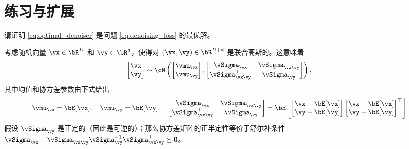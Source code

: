 \documentclass[../../book-main_zh.tex]{subfiles}
\begin{document}




\section{练习与扩展}

\begin{exercise}
    请证明 \eqref{eq:optimal_denoiser} 是问题 \eqref{eq:denoising_loss} 的最优解。
\end{exercise}

\begin{exercise}\label{exercise:conditional_gaussian}
  考虑随机向量 $\vx \in \bR^D$ 和 $\vy \in \bR^d$，使得对 $(\vx, \vy) \in \bR^{D + d}$ 是联合高斯的。这意味着
  \begin{equation*}
    \begin{bmatrix}
      \vx \\
      \vy
    \end{bmatrix}
    \sim
    \cN \left(
      \begin{bmatrix}
        \vmu_{\vx} \\
        \vmu_{\vy}
      \end{bmatrix}
      ,
      \begin{bmatrix}
        \vSigma_{\vx} & \vSigma_{\vx\vy} \\
        \vSigma_{\vx\vy}^\top & \vSigma_{\vy}
      \end{bmatrix}
    \right),
  \end{equation*}
  其中均值和协方差参数由下式给出
  \begin{equation*}
    \vmu_{\vx} = \bE[\vx],\quad \vmu_{\vy} = \bE[\vy],\quad
    \begin{bmatrix}
      \vSigma_{\vx} & \vSigma_{\vx\vy} \\
      \vSigma_{\vx\vy}^\top & \vSigma_{\vy}
    \end{bmatrix}
    =
    \bE\left[
      \begin{bmatrix}
        \vx - \bE[\vx] \\
        \vy - \bE[\vy]
      \end{bmatrix}
      \begin{bmatrix}
        \vx - \bE[\vx] \\
        \vy - \bE[\vy]
      \end{bmatrix}^\top
      \right]
  \end{equation*}
  假设 $\vSigma_{\vy}$ 是正定的（因此是可逆的）；那么协方差矩阵的正半定性等价于舒尔补条件 $\vSigma_{\vx} - \vSigma_{\vx\vy} \vSigma_{\vy}^{-1}
  \vSigma_{\vx\vy}^\top \succeq \Zero$。


\end{exercise}
\end{document}
